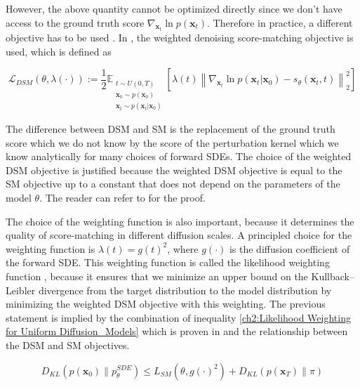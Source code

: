 However, the above quantity cannot be optimized directly since we don't have access to the ground truth score $\nabla_{\textbf{x}_t}{\ln{p(\textbf{x}_t)}}$. Therefore in practice, a different objective has to be used \cite{hyvarinen2005score_original, song2020generative_score, song2021sde}. In \cite{song2021sde}, the weighted denoising score-matching objective is used, which is defined as 

\begin{equation}
    \label{ch2:DSM for uniform diffusion_models}
    \mathcal{L}_{DSM}(\theta, \lambda(\cdot)) := \frac{1}{2} \mathbb{E}_{\substack{t \sim U(0,T) \\ \mathbf{x}_0 \sim p(\mathbf{x}_0) \\ \mathbf{x}_t \sim p(\mathbf{x}_t | \mathbf{x}_0)}}
    \left[\lambda(t) \left\| \nabla_{\mathbf{x}_t} \ln{p(\mathbf{x}_t | \mathbf{x}_0)} - s_\theta(\mathbf{x}_t,t) \right\|_2^2 \right]
\end{equation}
    

The difference between DSM and SM is the replacement of the ground truth score which we do not know by the score of the perturbation kernel which we know analytically for many choices of forward SDEs. The choice of the weighted DSM objective is justified because the weighted DSM objective is equal to the SM objective up to a constant that does not depend on the parameters of the model $\theta$. The reader can refer to \cite{vincent2011connection} for the proof. 

The choice of the weighting function is also important, because it determines the quality of score-matching in different diffusion scales. A principled choice for the weighting function is $\lambda(t) = g(t)^2$, where $g(\cdot)$ is the diffusion coefficient of the forward SDE. This weighting function is called the likelihood weighting function \cite{song2021maximum}, because it ensures that we minimize an upper bound on the Kullback–Leibler divergence from the target distribution to the model distribution by minimizing the weighted DSM objective with this weighting. The previous statement is implied by the combination of inequality \ref{ch2:Likelihood Weighting for Uniform Diffusion_Models} which is proven in \cite{song2021maximum} and the relationship between the DSM and SM objectives.

\begin{equation}\label{ch2:Likelihood Weighting for Uniform Diffusion_Models}
D_{KL}(p(\textbf{x}_0)\parallel p^{SDE}_{\theta})\leq L_{SM}(\theta, g(\cdot)^2)+D_{KL}(p(\textbf{x}_T)\parallel \pi)
\end{equation}


